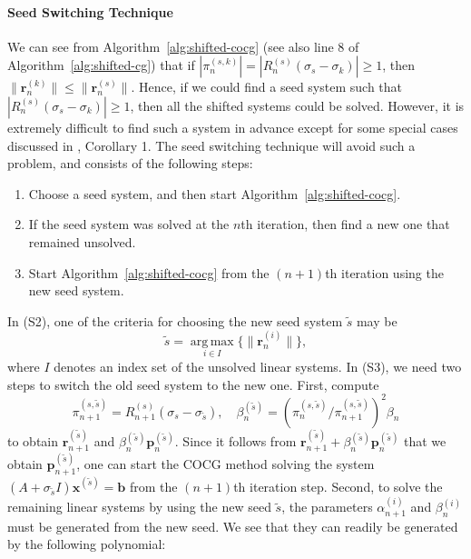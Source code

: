 \paragraph{{Seed Switching Technique}}\label{subsubsec:seed-switching}\mbox{}\par
{We can see from Algorithm\ \ref{alg:shifted-cocg} (see also line 8 of Algorithm\ \ref{alg:shifted-cg}) that if $|\pi_n^{(s,k)}|=|R_n^{(s)}(\sigma_s-\sigma_k)|\ge1$, then $\|\bm r_n^{(k)}\|\le\|\bm r_n^{(s)}\|$. Hence, if we could find a seed system such that $|R_n^{(s)}(\sigma_s-\sigma_k)|\ge1$, then all the shifted systems could be solved. However, it is extremely difficult to find such a system in advance except for some special cases discussed in , Corollary 1. The seed switching technique  will avoid such a problem, and consists of the following steps:}
\begin{enumerate}[label=(S\arabic*)]
\item {Choose a seed system, and then start Algorithm\ \ref{alg:shifted-cocg}.}
\item {If the seed system was solved at the $n$th iteration, then find a new one that remained unsolved.}
\item {Start Algorithm\ \ref{alg:shifted-cocg} from the $(n+1)$th iteration using the new seed system.}
\end{enumerate}
{In (S2), one of the criteria for choosing the new seed system $\widetilde s$ may be}
\[\widetilde s=\operatorname*{arg\,max}_{i\in I}\{\|\bm r_n^{(i)}\|\},\]
{where $I$ denotes an index set of the unsolved linear systems. In (S3), we need two steps to switch the old seed system to the new one. First, compute}
\[\pi_{n+1}^{(s,\widetilde s)}=R_{n+1}^{(s)}(\sigma_s-\sigma_{\widetilde s}),\quad\beta_n^{(\widetilde s)}=\left(\pi_n^{(s,\widetilde s)}/\pi_{n+1}^{(s,\widetilde s)}\right)^2\beta_n\]
{to obtain $\bm r_{n+1}^{(\widetilde s)}$ and $\beta_n^{(\widetilde s)}\bm p_n^{(\widetilde s)}$. Since it follows from $\bm r_{n+1}^{(\widetilde s)}+\beta_n^{(\widetilde s)}\bm p_n^{(\widetilde s)}$ that we obtain $\bm p_{n+1}^{(\widetilde s)}$, one can start the COCG method solving the system $(A+\sigma_{\widetilde s}I)\bm x^{(\widetilde s)}=\bm b$ from the $(n+1)$th iteration step. Second, to solve the remaining linear systems by using the new seed $\widetilde s$, the parameters $\alpha_{n+1}^{(i)}$ and $\beta_n^{(i)}$ must be generated from the new seed. We see that they can readily be generated by the following polynomial:}
